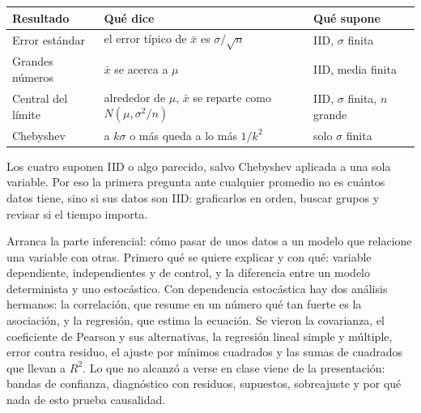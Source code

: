 \documentclass[11pt,letterpaper]{article}
\begin{document}
\begin{center}
\small
\begin{tabular}{l>{\raggedright\arraybackslash}p{5.6cm}%
                 >{\raggedright\arraybackslash}p{4.4cm}}
    \toprule
    \textbf{Resultado} & \textbf{Qué dice} & \textbf{Qué supone} \\
    \midrule
    Error estándar & el error típico de $\bar{x}$ es $\sigma/\sqrt{n}$
                   & IID, $\sigma$ finita \\
    \addlinespace
    Grandes números & $\bar{x}$ se acerca a $\mu$
                    & IID, media finita \\
    \addlinespace
    Central del límite & alrededor de $\mu$, $\bar{x}$ se reparte
                         como $N(\mu, \sigma^2 / n)$
                       & IID, $\sigma$ finita, $n$ grande \\
    \addlinespace
    Chebyshev & a $k\sigma$ o más queda a lo más $1/k^2$
              & solo $\sigma$ finita \\
    \bottomrule
\end{tabular}
\end{center}

\begin{idea}
    Los cuatro suponen IID o algo parecido, salvo Chebyshev aplicada a
    una sola variable. Por eso la primera pregunta ante cualquier
    promedio no es cuántos datos tiene, sino si sus datos son IID:
    graficarlos en orden, buscar grupos y revisar si el tiempo importa.
\end{idea}


\newpage


\begin{quick_sum}
    Arranca la parte inferencial: cómo pasar de unos datos a un modelo
    que relacione una variable con otras. Primero qué se quiere
    explicar y con qué: variable dependiente, independientes y de
    control, y la diferencia entre un modelo determinista y uno
    estocástico. Con dependencia estocástica hay dos análisis
    hermanos: la correlación, que resume en un número qué tan fuerte es
    la asociación, y la regresión, que estima la ecuación. Se vieron la
    covarianza, el coeficiente de Pearson y sus alternativas, la
    regresión lineal simple y múltiple, error contra residuo, el ajuste
    por mínimos cuadrados y las sumas de cuadrados que llevan a $R^2$.
    Lo que no alcanzó a verse en clase viene de la presentación: bandas
    de confianza, diagnóstico con residuos, supuestos, sobreajuste y por
    qué nada de esto prueba causalidad.
\end{quick_sum}
\end{document}
